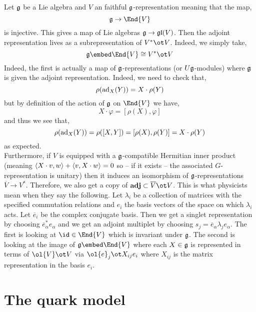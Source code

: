 \documentclass[12pt]{article}
\begin{document}
Let $\mathfrak{g}$ be a Lie algebra and $V$ an faithful $\mathfrak{g}$-representation meaning that the map,
\[ \g \to \End{V} \]
is injective. This gives a map of Lie algebras $\mathfrak{g} \to \mathfrak{gl}(V)$. Then the adjoint representation lives as a subrepresentation of $V^* \ot V$. Indeed, we simply take,
\[ \g \embed \End{V} \cong V^* \ot V \]
Indeed, the first is actually a map of $\mathfrak{g}$-representations (or $U \mathfrak{g}$-modules) where $\mathfrak{g}$ is given the adjoint representation. Indeed, we need to check that,
\[ \rho(\mathrm{ad}_X(Y)) = X \cdot \rho(Y) \]
but by definition of the action of $\mathfrak{g}$ on $\End{V}$ we have,
\[ X \cdot \varphi = [\rho(X), \varphi] \]
and thus we see that,
\[ \rho(\mathrm{ad}_X(Y)) = \rho([X,Y]) = [\rho(X), \rho(Y)] = X \cdot \rho(Y) \]
as expected. 
\bigskip\\
Furthermore, if $V$ is equipped with a $\mathfrak{g}$-compatible Hermitian inner product (meaning $\left< X \cdot v , w \right> + \left< v , X \cdot w \right> = 0$ so -- if it exists -- the associated $G$-representation is unitary) then it induces an isomorphism of $\mathfrak{g}$-representations $\overline{V} \to V^*$. Therefore, we also get a copy of $\mathbf{adj} \subset \overline{V} \ot V$. This is what physicists mean when they say the following. Let $\lambda_i$ be a collection of matrices with the specified commutation relations and $e_i$ the basis vectors of the space on which $\lambda_i$ acts. Let $\overline{e}_i$ be the complex conjugate basis. Then we get a singlet representation by choosing $\overline{e}_\alpha^* e_\alpha$ and we get an adjoint multiplet by choosing $s_j = \overline{e}_\alpha \lambda_j e_\alpha$. The first is looking at $\id \in \End{V}$ which is invariant under $\mathfrak{g}$. The second is looking at the image of $\g \embed \End{V}$ where each $X \in \mathfrak{g}$ is represented in terms of $\ol{V} \ot V$ via $\ol{e}_j \ot X_{ij} e_i$ where $X_{ij}$ is the matrix representation in the basis $e_i$. 

\section{The quark model}
\end{document}
